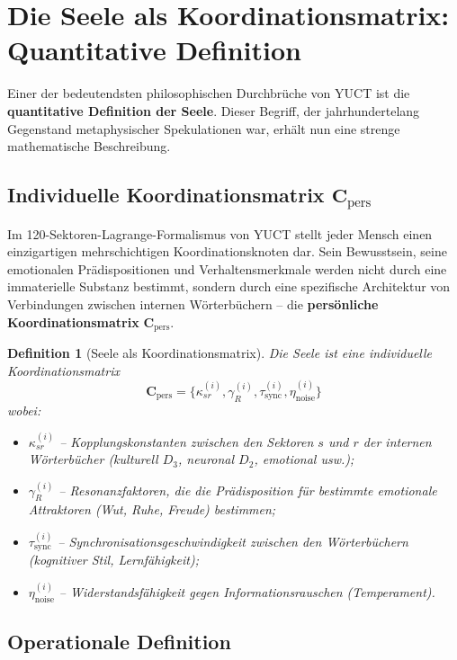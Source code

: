 \documentclass[12pt,a4paper]{article}
\newcommand{\Cpers}{\mathbf{C}_{\text{pers}}}
\newtheorem{definition}{Definition}[section]
\begin{document}
	\section{Die Seele als Koordinationsmatrix: Quantitative Definition}
	\label{sec:soul}
	
	Einer der bedeutendsten philosophischen Durchbrüche von YUCT ist die \textbf{quantitative Definition der Seele}. Dieser Begriff, der jahrhundertelang Gegenstand metaphysischer Spekulationen war, erhält nun eine strenge mathematische Beschreibung.
	
	\subsection{Individuelle Koordinationsmatrix \(\Cpers\)}
	
	Im 120-Sektoren-Lagrange-Formalismus von YUCT stellt jeder Mensch einen einzigartigen mehrschichtigen Koordinationsknoten dar. Sein Bewusstsein, seine emotionalen Prädispositionen und Verhaltensmerkmale werden nicht durch eine immaterielle Substanz bestimmt, sondern durch eine spezifische Architektur von Verbindungen zwischen internen Wörterbüchern – die \textbf{persönliche Koordinationsmatrix} \(\Cpers\).
	
	\begin{definition}[Seele als Koordinationsmatrix]
		Die Seele ist eine individuelle Koordinationsmatrix
		\[
		\Cpers = \{\kappa_{sr}^{(i)}, \gamma_R^{(i)}, \tau_{\text{sync}}^{(i)}, \eta_{\text{noise}}^{(i)}\}
		\]
		wobei:
		\begin{itemize}
			\item \(\kappa_{sr}^{(i)}\) – Kopplungskonstanten zwischen den Sektoren \(s\) und \(r\) der internen Wörterbücher (kulturell \(D_3\), neuronal \(D_2\), emotional usw.);
			\item \(\gamma_R^{(i)}\) – Resonanzfaktoren, die die Prädisposition für bestimmte emotionale Attraktoren (Wut, Ruhe, Freude) bestimmen;
			\item \(\tau_{\text{sync}}^{(i)}\) – Synchronisationsgeschwindigkeit zwischen den Wörterbüchern (kognitiver Stil, Lernfähigkeit);
			\item \(\eta_{\text{noise}}^{(i)}\) – Widerstandsfähigkeit gegen Informationsrauschen (Temperament).
		\end{itemize}
	\end{definition}
	
	\subsection{Operationale Definition}
	
\end{document}
